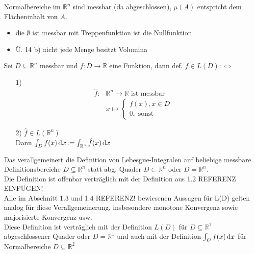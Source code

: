 \begin{remark}
    Normalbereiche im $\mathbb{R}^n$ sind messbar (da abgeschlossen), $\mu (A)$ entspricht dem Flächeninhalt von $A$.
    \begin{itemize}
        \item die $\emptyset$ ist messbar mit Treppenfunktion ist die Nullfunktion
        \item Ü. 14 b) nicht jede Menge besitzt Volumina
    \end{itemize}
\end{remark}

\begin{definition}
    Sei $D\subseteq\mathbb{R}^n$ messbar und $f\colon D\to \mathbb{R}$ eine Funktion, dann def. $f\in L(D)\colon \Leftrightarrow$
        \begin{itemize}
            \item[1)]
            \begin{align*}
                \hat{f}\colon & \mathbb{R}^n \to \mathbb{R} \text{ ist messbar}\\
                & x \mapsto \left\{
                    \begin{matrix*}
                    f(x), x \in D\\
                    0, \text{ sonst}
                    \end{matrix*}\right.
            \end{align*}
            \item[2)] $\hat{f} \in L(\mathbb{R}^n)$\\
            Dann $\int_{D} f(x) \,\text{d}x \coloneqq \int_{{\mathbb{R}^n}} {\hat{f}(x)} \,\text{d}x$ 
        \end{itemize}
    Das verallgemeinert die Definition von Lebesgue-Integralen auf beliebige messbare Definitionsbereiche $D\subseteq\mathbb{R}^n$ statt abg. Quader $D\subset\mathbb{R}^n$ oder $D=\mathbb{R}^n$.\\
    Die Definition ist offenbar verträglich mit der Definition aus 1.2 REFERENZ EINFÜGEN!\\
    Alle im Abschnitt 1.3 und 1.4 REFERENZ! bewiesenen Aussagen für L(D) gelten analog für diese Verallgemeinerung, insbesondere monotone Konvergenz sowie majorisierte Konvergenz usw.\\
    Diese Definition ist verträglich mit der Definition $L(D)$ für $D\subseteq\mathbb{R}^1$ abgeschlossener Quader oder $D=\mathbb{R}^1$ und auch mit der Definition $\int_{D} f(x) \,\text{d}x$ für Normalbereiche $D\subseteq\mathbb{R}^2$
\end{definition}

